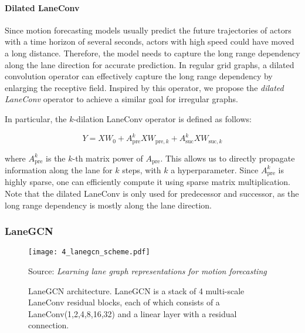 \paragraph{Dilated LaneConv}

Since motion forecasting models usually predict the future trajectories of actors with a time horizon of several seconds, actors with high speed could have moved a long distance.
Therefore, the model needs to capture the long range dependency along the lane direction for accurate prediction. In regular grid graphs, a dilated convolution operator \cite{yu2015multi} can effectively capture the long range dependency by enlarging the receptive field. Inspired by this operator, we propose the \textit{dilated LaneConv} operator to achieve a similar goal for irregular graphs. 

In particular, the $k$-dilation LaneConv operator is defined as follows:
 
\begin{equation}
	Y = XW_0 + A_{\text{pre}}^k X W_{\text{pre},k} + A_{\text{suc}}^k X W_{\text{suc},k}
	\label{eqn:dilated_laneconv}
\end{equation}

where $A_{\text{pre}}^k$ is the $k$-th matrix power of $A_{\text{pre}}$. 
This  allows us to directly propagate information along the lane for $k$ steps, with $k$ a hyperparameter. Since $A_{\text{pre}}^k$ is highly sparse, one can efficiently compute it using sparse matrix multiplication. Note that the dilated LaneConv is only used for predecessor and successor, as the long range dependency is mostly along the lane direction.

\subsubsection{LaneGCN}\label{sec:LGN}
\label{subsubsec:4_improving_efficiency_lanegcn}

\begin{figure}[t]                               
	\begin{center}
		\texttt{[image: 4\_lanegcn\_scheme.pdf]}
	\end{center}
	\caption[LaneGCN architecture]{LaneGCN architecture. LaneGCN is a stack of 4 multi-scale LaneConv residual blocks, each of which consists of a LaneConv(1,2,4,8,16,32) and a linear layer with a residual connection.}
	Source: \textit{Learning lane graph representations for motion forecasting} \cite{liang2020learning}
	\label{fig:4_improving_efficiency_lanegcn}
\end{figure}
	
